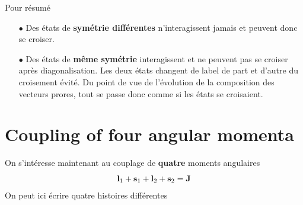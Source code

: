 Pour résumé
\begin{itemize}
\item[$\bullet$] Des états de \textbf{symétrie différentes} n'interagissent jamais et peuvent
donc se croiser.
\item[$\bullet$] Des états de \textbf{même symétrie} interagissent et ne peuvent pas se 
croiser après diagonalisation. Les deux états changent de label de part et d'autre du croisement
évité. Du point de vue de l'évolution de la composition des vecteurs prores, tout se passe
donc comme si les états se croisaient.
\end{itemize}


\section{Coupling of four angular momenta}
On s'intéresse maintenant au couplage de \textbf{quatre} moments angulaires
\begin{equation}
{\bf l}_1 +   {\bf  s}_1 + {\bf  l}_2 + {\bf  s}_2 = {\bf  J}
\end{equation}
On peut ici écrire quatre histoires différentes

